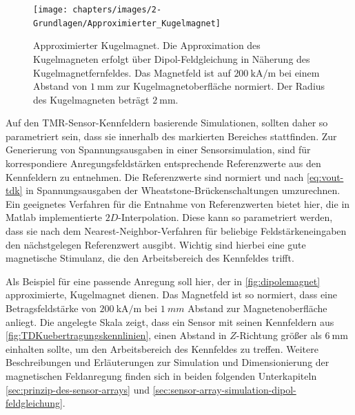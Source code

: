 \vspace{5mm}
\begin{figure}[tph]
	\centering
	\texttt{[image: chapters/images/2-Grundlagen/Approximierter\_Kugelmagnet]}
	\caption[Approximierter Kugelmagnet]{Approximierter Kugelmagnet. Die Approximation des Kugelmagneten erfolgt 
		über Dipol-Feldgleichung in Näherung des Kugelmagnetfernfeldes. Das Magnetfeld ist auf 
		$\SI{200}{\kilo\ampere\per\metre}$ bei einem Abstand von $\SI{1}{\milli\metre}$ zur Kugelmagnetoberfläche 
		normiert. Der Radius des Kugelmagneten beträgt $\SI{2}{\milli\metre}$.}
	\label{fig:dipolemagnet}
\end{figure}


Auf den TMR-Sensor-Kennfeldern basierende Simulationen, sollten daher so parametriert sein, dass sie innerhalb des markierten Bereiches stattfinden. Zur Generierung von Spannungsausgaben in einer Sensorsimulation, sind für korrespondiere Anregungsfeldstärken entsprechende Referenzwerte aus den Kennfeldern zu entnehmen. Die  Referenzwerte sind normiert und nach \autoref{eq:vout-tdk} in Spannungsausgaben der Wheatstone-Brückenschaltungen umzurechnen. Ein geeignetes Verfahren für die Entnahme von Referenzwerten bietet hier, die in Matlab implementierte $2D$-Interpolation. Diese kann so parametriert werden, dass sie nach dem Nearest-Neighbor-Verfahren für beliebige Feldstärkeneingaben den nächstgelegen Referenzwert ausgibt. Wichtig sind hierbei eine gute magnetische Stimulanz, die den Arbeitsbereich des Kennfeldes trifft.


\clearpage


Als Beispiel für eine passende Anregung soll hier, der in \autoref{fig:dipolemagnet} approximierte, Kugelmagnet dienen. Das Magnetfeld ist so normiert, dass eine Betragsfeldstärke von $\SI{200}{\kilo\ampere\per\metre}$ bei $\SI{1}{mm}$ Abstand zur Magnetenoberfläche anliegt. Die angelegte Skala zeigt, dass ein Sensor mit seinen Kennfeldern aus \autoref{fig:TDKuebertragungskennlinien}, einen Abstand in $Z$-Richtung größer als $\SI{6}{\milli\metre}$ einhalten sollte, um den Arbeitsbereich des Kennfeldes zu treffen. Weitere Beschreibungen und Erläuterungen zur Simulation und Dimensionierung der magnetischen Feldanregung finden sich in beiden folgenden Unterkapiteln \autoref{sec:prinzip-des-sensor-arrays} und \autoref{sec:sensor-array-simulation-dipol-feldgleichung}.



